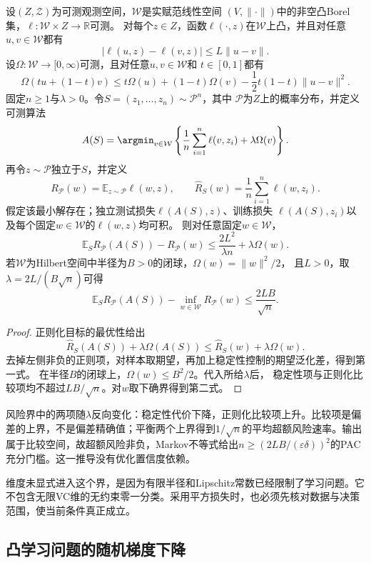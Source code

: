 \begin{theorem}[正则化学习的期望风险保证]
\label{thm:regularized-learning-risk}
设$(Z,\mathcal Z)$为可测观测空间，$\mathcal W$是实赋范线性空间
$(V,\|\cdot\|)$中的非空凸Borel集，$\ell:\mathcal W\times Z\to\mathbb R$可测。
对每个$z\in Z$，函数$\ell(\cdot,z)$在$\mathcal W$上凸，并且对任意
$u,v\in\mathcal W$都有
\[
 |\ell(u,z)-\ell(v,z)|\leq L\|u-v\|.
\]
设$\Omega:\mathcal W\to[0,\infty)$可测，且对任意$u,v\in\mathcal W$和
$t\in[0,1]$都有
\[
 \Omega(tu+(1-t)v)
 \leq t\Omega(u)+(1-t)\Omega(v)-\frac12t(1-t)\|u-v\|^2.
\]
固定$n\geq1$与$\lambda>0$。令$S=(z_1,\ldots,z_n)\sim\mathcal P^n$，其中
$\mathcal P$为$Z$上的概率分布，并定义可测算法
\[
 A(S)=\argmin_{v\in\mathcal W}
 \left\{\frac1n\sum_{i=1}^n\ell(v,z_i)+\lambda\Omega(v)\right\}.
\]
再令$z\sim\mathcal P$独立于$S$，并定义
\[
 R_{\mathcal P}(w)=\mathbb E_{z\sim\mathcal P}\ell(w,z),
 \qquad
 \hat R_S(w)=\frac1n\sum_{i=1}^n\ell(w,z_i).
\]
假定该最小解存在；独立测试损失$\ell(A(S),z)$、训练损失
$\ell(A(S),z_i)$以及每个固定$w\in\mathcal W$的$\ell(w,z)$均可积。
则对任意固定$w\in\mathcal W$，
\begin{equation}
 \mathbb E_S R_{\mathcal P}(A(S))-R_{\mathcal P}(w)
 \leq\frac{2L^2}{\lambda n}+\lambda\Omega(w).
 \label{eq:regularization-excess-risk}
\end{equation}
若$\mathcal W$为Hilbert空间中半径为$B>0$的闭球，$\Omega(w)=\|w\|^2/2$，
且$L>0$，取$\lambda=2L/(B\sqrt n)$可得
\[
 \mathbb E_S R_{\mathcal P}(A(S))-\inf_{w\in\mathcal W}R_{\mathcal P}(w)
 \leq\frac{2LB}{\sqrt n}.
\]
\end{theorem}
\begin{proof}
正则化目标的最优性给出
\[
 \hat R_S(A(S))+\lambda\Omega(A(S))
 \leq\hat R_S(w)+\lambda\Omega(w).
\]
去掉左侧非负的正则项，对样本取期望，再加上稳定性控制的期望泛化差，得到第一式。
在半径$B$的闭球上，$\Omega(w)\leq B^2/2$。代入所给$\lambda$后，
稳定性项与正则化比较项均不超过$LB/\sqrt n$。对$w$取下确界得到第二式。
\end{proof}

风险界中的两项随$\lambda$反向变化：稳定性代价下降，正则化比较项上升。比较项是偏差的上界，不是偏差精确值；平衡两个上界得到$1/\sqrt n$的平均超额风险速率。输出属于比较空间，故超额风险非负，Markov不等式给出$n\geq(2LB/(\varepsilon\delta))^2$的PAC充分门槛。这一推导没有优化置信度依赖。

维度未显式进入这个界，是因为有限半径和Lipschitz常数已经限制了学习问题。它不包含无限VC维的无约束零一分类。采用平方损失时，也必须先核对数据与决策范围，使当前条件真正成立。

\subsection{凸学习问题的随机梯度下降}
\label{sec:sgd-stability}

